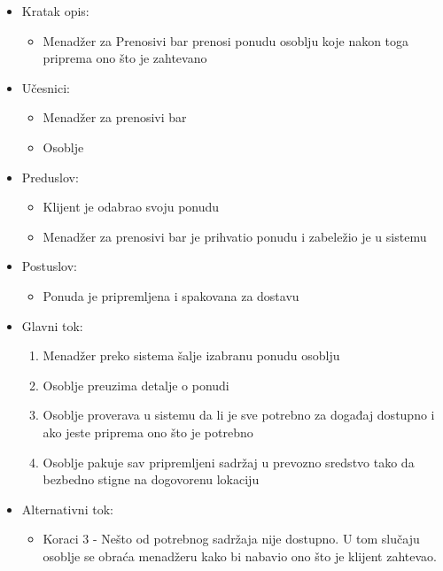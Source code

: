 \documentclass[a4paper]{article}
\begin{document}
\begin{itemize}
    \item Kratak opis:
        \begin{itemize}
            \item Menadžer za Prenosivi bar prenosi ponudu osoblju koje nakon toga priprema ono što je zahtevano
        \end{itemize}
    \item Učesnici:
        \begin{itemize}
            \item Menadžer za prenosivi bar
            \item Osoblje
        \end{itemize}
    \item Preduslov:
        \begin{itemize}
            \item Klijent je odabrao svoju ponudu
		    \item Menadžer za prenosivi bar je prihvatio ponudu i zabeležio je u sistemu
        \end{itemize}
    \item Postuslov:
        \begin{itemize}
            \item Ponuda je pripremljena i spakovana za dostavu
        \end{itemize}
    \item Glavni tok:
        \begin{enumerate}
           \item Menadžer preko sistema šalje izabranu ponudu osoblju
		   \item Osoblje preuzima detalje o ponudi
	       \item Osoblje proverava u sistemu da li je sve potrebno za događaj dostupno i ako jeste priprema ono što je potrebno
	        \item Osoblje pakuje sav pripremljeni sadržaj u prevozno sredstvo tako da bezbedno stigne na dogovorenu lokaciju
        \end{enumerate}
    \item Alternativni tok:
        \begin{itemize}
            \item Koraci 3 - Nešto od potrebnog sadržaja nije dostupno. U tom slučaju osoblje se obraća menadžeru kako bi nabavio ono što je klijent zahtevao.
        \end{itemize}
\end{itemize}
\end{document}
